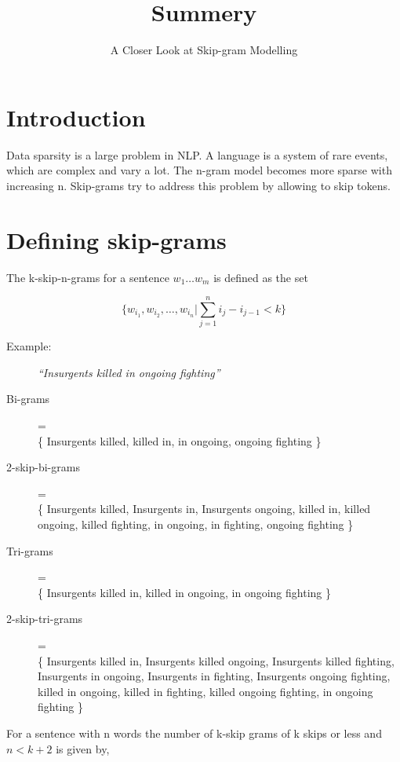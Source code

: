 \documentclass{article}
\title{Summery}
\subtitle{A Closer Look at Skip-gram Modelling}
\author{}
\date{} %
\begin{document}
\maketitle

\section{Introduction}

Data sparsity is a large problem in NLP.
A language is a system of rare events, which are complex and vary a lot.
The n-gram model becomes more sparse with increasing n.
Skip-grams try to address this problem by allowing to skip tokens.

\section{Defining skip-grams}

The k-skip-n-grams for a sentence $w_1\ldots w_m$ is defined as the set

$$
\{w_{i_1}, w_{i_2}, \ldots, w_{i_n} | \sum_{j=1}^{n} i_j - i_{j-1} < k \}
$$

\begin{description}
\item[Example:] \it{``Insurgents killed in ongoing fighting''}
\item[Bi-grams] = \hfill \\
  \{
  Insurgents killed,
  killed in,
  in ongoing,
  ongoing fighting
  \}
\item[2-skip-bi-grams] = \hfill \\
  \{
  Insurgents killed,
  Insurgents in,
  Insurgents ongoing,
  killed in,
  killed ongoing,
  killed fighting,
  in ongoing,
  in fighting,
  ongoing fighting
  \}
\item[Tri-grams] = \hfill \\
  \{
  Insurgents killed in,
  killed in ongoing,
  in ongoing fighting
  \}
\item[2-skip-tri-grams] = \hfill \\
  \{
  Insurgents killed in,
  Insurgents killed ongoing,
  Insurgents killed fighting,
  Insurgents in ongoing,
  Insurgents in fighting,
  Insurgents ongoing fighting,
  killed in ongoing,
  killed in fighting,
  killed ongoing fighting,
  in ongoing fighting
  \}
\end{description}

For a sentence with n words the number of k-skip grams of k skips or less and $n < k+2$ is given by,
\end{document}
